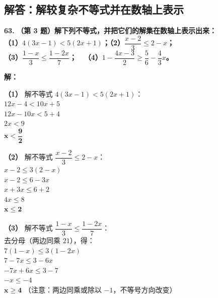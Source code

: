 \newpage

\newpage

\subsection{解答：解较复杂不等式并在数轴上表示}

\vspace{0.6cm}

\textbf{\LARGE 63.} \textbf{（第 3 题）解下列不等式，并把它们的解集在数轴上表示出来：\\
（1）$4(3x-1) < 5(2x+1)$；\qquad\quad （2）$\dfrac{x-2}{3} \leqslant 2-x$；\\[1.5ex]
（3）$\dfrac{1-x}{3} \leqslant \dfrac{1-2x}{7}$；\qquad\qquad\,\,\,\, （4）$1 - \dfrac{4x-3}{2} \geqslant \dfrac{5}{6} - \dfrac{4}{3}x$。}

\vspace{0.4cm}
\textbf{解：}

\textbf{（1）} 解不等式 $4(3x-1) < 5(2x+1)$：\\
\hspace*{0.8cm} $12x - 4 < 10x + 5$\\
\hspace*{0.8cm} $12x - 10x < 5 + 4$\\
\hspace*{0.8cm} $2x < 9$\\
\hspace*{0.8cm} $\boldsymbol{x < \dfrac{9}{2}}$

\textbf{（2）} 解不等式 $\dfrac{x-2}{3} \leqslant 2-x$：\\
\hspace*{0.8cm} $x - 2 \leqslant 3(2 - x)$\\
\hspace*{0.8cm} $x - 2 \leqslant 6 - 3x$\\
\hspace*{0.8cm} $x + 3x \leqslant 6 + 2$\\
\hspace*{0.8cm} $4x \leqslant 8$\\
\hspace*{0.8cm} $\boldsymbol{x \leqslant 2}$

\textbf{（3）} 解不等式 $\dfrac{1-x}{3} \leqslant \dfrac{1-2x}{7}$：\\
\hspace*{0.8cm} 去分母（两边同乘 $21$），得：\\
\hspace*{0.8cm} $7(1 - x) \leqslant 3(1 - 2x)$\\
\hspace*{0.8cm} $7 - 7x \leqslant 3 - 6x$\\
\hspace*{0.8cm} $-7x + 6x \leqslant 3 - 7$\\
\hspace*{0.8cm} $-x \leqslant -4$\\
\hspace*{0.8cm} $\boldsymbol{x \geqslant 4}$ （注意：两边同乘或除以 $-1$，不等号方向改变）

